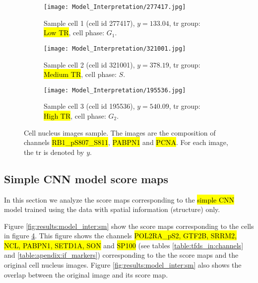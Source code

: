 \begin{figure}[!ht]
  \centering
  \begin{subfigure}[b]{.3\linewidth}
    \texttt{[image: Model\_Interpretation/277417.jpg]}
    \caption{Sample cell 1 (cell id 277417), $y=133.04$, \gls{tr} group: \hl{Low TR}, cell phase: $G_1$.}
    \label{fig:results:model_inter_cell_samp:cell_1}
  \end{subfigure}
  \begin{subfigure}[b]{.3\linewidth}
    \texttt{[image: Model\_Interpretation/321001.jpg]}
    \caption{Sample cell 2 (cell id 321001), $y=378.19$, \gls{tr} group: \hl{Medium TR}, cell phase: $S$.}
    \label{fig:results:model_inter_cell_samp:cell_2}
  \end{subfigure}
  \begin{subfigure}[b]{.3\linewidth}
    \texttt{[image: Model\_Interpretation/195536.jpg]}
    \caption{Sample cell 3 (cell id 195536), $y=540.09$, \gls{tr} group: \hl{High TR}, cell phase: $G_2$.}
    \label{fig:results:model_inter_cell_samp:cell_3}
  \end{subfigure}
  \caption{Cell nucleus images sample. The images are the composition of channels \hl{RB1\_pS807\_S811}, \hl{PABPN1} and \hl{PCNA}. For each image, the \gls{tr} is denoted by $y$.}
  \label{fig:results:model_inter_cell_samp}
\end{figure}

\subsection{Simple CNN model score maps}

In this section we analyze the score maps corresponding to the \hl{simple CNN} model trained using the data with spatial information (structure) only.

Figure \ref{fig:results:model_inter:sm} show the score maps corresponding to the cells in figure \ref{fig:results:model_inter_cell_samp}. This figure shows the channels \hl{POL2RA\_pS2, GTF2B, SRRM2, NCL, PABPN1, SETD1A, SON} and \hl{SP100} (see tables \ref{table:tfds_in:channels} and \ref{table:apendix:if_markers}) corresponding to the the score maps and the original cell nucleus images.
Figure \ref{fig:results:model_inter:sm} also shows the overlap between the original image and its score map.

